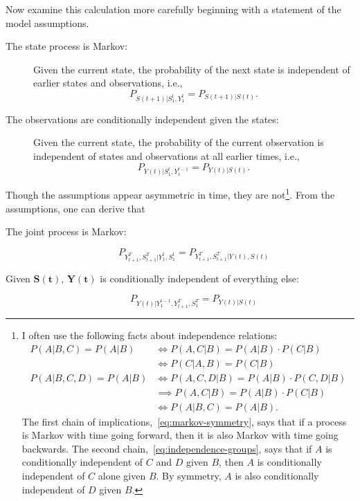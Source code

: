 \documentclass[]{article}
\newcommand{\ts}[3]{#1_{#2}^{#3}}                    %
\newcommand{\ti}[2]{{#1}{(#2)}}                  %
\newcommand{\ie}{i.e.\xspace}
\begin{document}
Now examine this calculation more carefully beginning with a statement
of the model assumptions.
\begin{description}
\item[The state process is Markov:] Given the current state, the
  probability of the next state is independent of earlier states and
  observations, \ie,
  \begin{equation}
    \label{eq:assume_markov}
    P_{\ti{S}{t+1}|\ts{S}{1}{t},\ts{Y}{1}{t}} = %
        P_{\ti{S}{t+1}|\ti{S}{t}}.
  \end{equation}
\item[The observations are conditionally independent given the states:]
  Given the current state, the probability of the current observation is
  independent of states and observations at all earlier times, \ie,
  \begin{equation}
    \label{eq:assume_output}
    P_{\ti{Y}{t}|\ts{S}{1}{t},\ts{Y}{1}{t-1}} = %
        P_{\ti{Y}{t}|\ti{S}{t}}.
  \end{equation}
\end{description}
Though the assumptions appear asymmetric in time, they are
not\footnote{I often use the following facts about independence
  relations:
  \begin{align}
    P(A|B,C) = P(A|B)   &\iff     P(A,C|B) = P(A|B) \cdot P(C|B)\nonumber\\
    \label{eq:markov-symmetry}%
                        &\iff     P(C|A,B) = P(C|B)\\
    P(A|B,C,D) = P(A|B) &\iff     P(A,C,D|B) = P(A|B) \cdot P(C,D|B)\nonumber\\
                        &\implies P(A,C|B) = P(A|B) \cdot P(C|B)\nonumber\\
    \label{eq:independence-groups}%
                        &\iff     P(A|B,C) = P(A|B).
  \end{align}
  The first chain of implications,~\eqref{eq:markov-symmetry}, says
  that if a process is Markov with time going forward, then it is also
  Markov with time going backwards.  The second
  chain,~\eqref{eq:independence-groups}, says that if $A$ is
  conditionally independent of $C$ and $D$ given $B$, then $A$ is
  conditionally independent of $C$ alone given $B$.  By symmetry, $A$
  is also conditionally independent of $D$ given $B$.}.  From the
assumptions, one can derive that
\begin{description}
\item[The joint process is Markov:]
  \begin{equation*}
    P_{\ts{Y}{t+1}{T},\ts{S}{t+1}{T}|\ts{Y}{1}{t},\ts{S}{1}{t}}
      = P_{\ts{Y}{t+1}{T},\ts{S}{t+1}{T}|\ti{Y}{t},\ti{S}{t}}
  \end{equation*}
\item[Given $\bm{\ti{S}{t}}$, $\bm{\ti{Y}{t}}$ is conditionally independent of everything else:]
  \begin{equation*}
    P_{\ti{Y}{t} |\ts{Y}{1}{t-1},\ts{Y}{t+1}{T}, \ts{S}{1}{T}} = P_{\ti{Y}{t} |\ti{S}{t}}
  \end{equation*}
\end{description}
\end{document}
